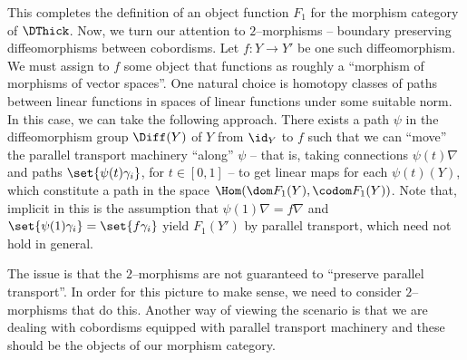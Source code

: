 \documentclass[\PRJWD/Thick_TQFTs_and_Quantum_Information.tex]{subfiles}
\begin{document}
This completes the definition of an object function $F_1$ for the morphism
category of $\DThick$. Now, we turn our attention to $2$--morphisms -- boundary
preserving diffeomorphisms between cobordisms. Let $f : Y \to Y'$ be one such
diffeomorphism. We must assign to $f$ some object that functions as roughly a
``morphism of morphisms of vector spaces''. One natural choice is homotopy
classes of paths between linear functions in spaces of linear functions under
some suitable norm. In this case, we can take the following approach.  There
exists a path $\psi$ in the diffeomorphism group $\Diff(Y)$ of $Y$ from $\id_Y$
to $f$ such that we can ``move'' the parallel transport machinery ``along''
$\psi$ -- that is, taking connections $\psi(t)\nabla$ and paths
$\set{\psi(t)\gamma_i}$, for $t \in [0, 1]$ -- to get linear maps for each
$\psi(t)(Y)$, which constitute a path in the space $\Hom(\dom F_1(Y), \codom
F_1(Y))$. Note that, implicit in this is the assumption that
$\psi(1)\nabla = f\nabla$ and $\set{\psi(1)\gamma_i} = \set{f\gamma_i}$ yield
$F_1(Y')$ by parallel transport, which need not hold in general.

The issue is that the $2$--morphisms are not guaranteed to ``preserve parallel
transport''. In order for this picture to make sense, we need to consider
$2$--morphisms that do this. Another way of viewing the scenario is that we are
dealing with cobordisms equipped with parallel transport machinery and these
should be the objects of our morphism category.
\end{document}
